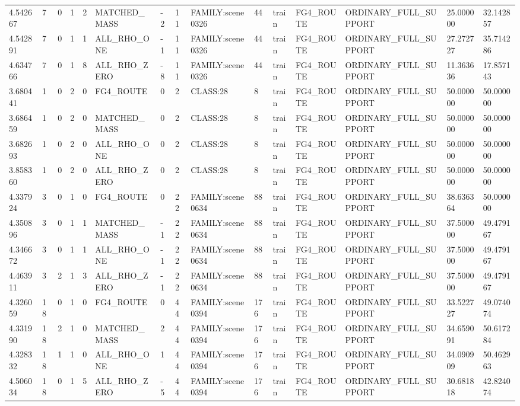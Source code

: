 \begin{tabular}{lllllllllllllll}
4.542667 & 7 & 0 & 1 & 2 & MATCHED\_MASS & -2 & 11 & FAMILY:scene0326 & 44 & train & FG4\_ROUTE & ORDINARY\_FULL\_SUPPORT & 25.000000 & 32.142857 \\
4.542891 & 7 & 0 & 1 & 1 & ALL\_RHO\_ONE & -1 & 11 & FAMILY:scene0326 & 44 & train & FG4\_ROUTE & ORDINARY\_FULL\_SUPPORT & 27.272727 & 35.714286 \\
4.634766 & 7 & 0 & 1 & 8 & ALL\_RHO\_ZERO & -8 & 11 & FAMILY:scene0326 & 44 & train & FG4\_ROUTE & ORDINARY\_FULL\_SUPPORT & 11.363636 & 17.857143 \\
3.680441 & 1 & 0 & 2 & 0 & FG4\_ROUTE & 0 & 2 & CLASS:28 & 8 & train & FG4\_ROUTE & ORDINARY\_FULL\_SUPPORT & 50.000000 & 50.000000 \\
3.686459 & 1 & 0 & 2 & 0 & MATCHED\_MASS & 0 & 2 & CLASS:28 & 8 & train & FG4\_ROUTE & ORDINARY\_FULL\_SUPPORT & 50.000000 & 50.000000 \\
3.682693 & 1 & 0 & 2 & 0 & ALL\_RHO\_ONE & 0 & 2 & CLASS:28 & 8 & train & FG4\_ROUTE & ORDINARY\_FULL\_SUPPORT & 50.000000 & 50.000000 \\
3.858360 & 1 & 0 & 2 & 0 & ALL\_RHO\_ZERO & 0 & 2 & CLASS:28 & 8 & train & FG4\_ROUTE & ORDINARY\_FULL\_SUPPORT & 50.000000 & 50.000000 \\
4.337924 & 3 & 0 & 1 & 0 & FG4\_ROUTE & 0 & 22 & FAMILY:scene0634 & 88 & train & FG4\_ROUTE & ORDINARY\_FULL\_SUPPORT & 38.636364 & 50.000000 \\
4.350896 & 3 & 0 & 1 & 1 & MATCHED\_MASS & -1 & 22 & FAMILY:scene0634 & 88 & train & FG4\_ROUTE & ORDINARY\_FULL\_SUPPORT & 37.500000 & 49.479167 \\
4.346672 & 3 & 0 & 1 & 1 & ALL\_RHO\_ONE & -1 & 22 & FAMILY:scene0634 & 88 & train & FG4\_ROUTE & ORDINARY\_FULL\_SUPPORT & 37.500000 & 49.479167 \\
4.463911 & 3 & 2 & 1 & 3 & ALL\_RHO\_ZERO & -1 & 22 & FAMILY:scene0634 & 88 & train & FG4\_ROUTE & ORDINARY\_FULL\_SUPPORT & 37.500000 & 49.479167 \\
4.326059 & 18 & 0 & 1 & 0 & FG4\_ROUTE & 0 & 44 & FAMILY:scene0394 & 176 & train & FG4\_ROUTE & ORDINARY\_FULL\_SUPPORT & 33.522727 & 49.074074 \\
4.331990 & 18 & 2 & 1 & 0 & MATCHED\_MASS & 2 & 44 & FAMILY:scene0394 & 176 & train & FG4\_ROUTE & ORDINARY\_FULL\_SUPPORT & 34.659091 & 50.617284 \\
4.328332 & 18 & 1 & 1 & 0 & ALL\_RHO\_ONE & 1 & 44 & FAMILY:scene0394 & 176 & train & FG4\_ROUTE & ORDINARY\_FULL\_SUPPORT & 34.090909 & 50.462963 \\
4.506034 & 18 & 0 & 1 & 5 & ALL\_RHO\_ZERO & -5 & 44 & FAMILY:scene0394 & 176 & train & FG4\_ROUTE & ORDINARY\_FULL\_SUPPORT & 30.681818 & 42.824074 \\

\end{tabular}
